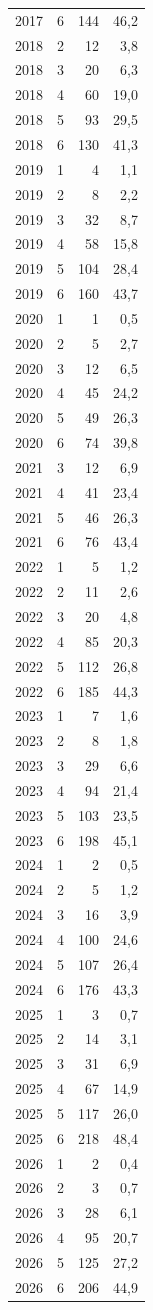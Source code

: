 \begin{longtable}{lrrr}
2017 & 6 & 144 & 46,2 \\
2018 & 2 & 12 & 3,8 \\
2018 & 3 & 20 & 6,3 \\
2018 & 4 & 60 & 19,0 \\
2018 & 5 & 93 & 29,5 \\
2018 & 6 & 130 & 41,3 \\
2019 & 1 & 4 & 1,1 \\
2019 & 2 & 8 & 2,2 \\
2019 & 3 & 32 & 8,7 \\
2019 & 4 & 58 & 15,8 \\
2019 & 5 & 104 & 28,4 \\
2019 & 6 & 160 & 43,7 \\
2020 & 1 & 1 & 0,5 \\
2020 & 2 & 5 & 2,7 \\
2020 & 3 & 12 & 6,5 \\
2020 & 4 & 45 & 24,2 \\
2020 & 5 & 49 & 26,3 \\
2020 & 6 & 74 & 39,8 \\
2021 & 3 & 12 & 6,9 \\
2021 & 4 & 41 & 23,4 \\
2021 & 5 & 46 & 26,3 \\
2021 & 6 & 76 & 43,4 \\
2022 & 1 & 5 & 1,2 \\
2022 & 2 & 11 & 2,6 \\
2022 & 3 & 20 & 4,8 \\
2022 & 4 & 85 & 20,3 \\
2022 & 5 & 112 & 26,8 \\
2022 & 6 & 185 & 44,3 \\
2023 & 1 & 7 & 1,6 \\
2023 & 2 & 8 & 1,8 \\
2023 & 3 & 29 & 6,6 \\
2023 & 4 & 94 & 21,4 \\
2023 & 5 & 103 & 23,5 \\
2023 & 6 & 198 & 45,1 \\
2024 & 1 & 2 & 0,5 \\
2024 & 2 & 5 & 1,2 \\
2024 & 3 & 16 & 3,9 \\
2024 & 4 & 100 & 24,6 \\
2024 & 5 & 107 & 26,4 \\
2024 & 6 & 176 & 43,3 \\
2025 & 1 & 3 & 0,7 \\
2025 & 2 & 14 & 3,1 \\
2025 & 3 & 31 & 6,9 \\
2025 & 4 & 67 & 14,9 \\
2025 & 5 & 117 & 26,0 \\
2025 & 6 & 218 & 48,4 \\
2026 & 1 & 2 & 0,4 \\
2026 & 2 & 3 & 0,7 \\
2026 & 3 & 28 & 6,1 \\
2026 & 4 & 95 & 20,7 \\
2026 & 5 & 125 & 27,2 \\
2026 & 6 & 206 & 44,9 \\
\end{longtable}